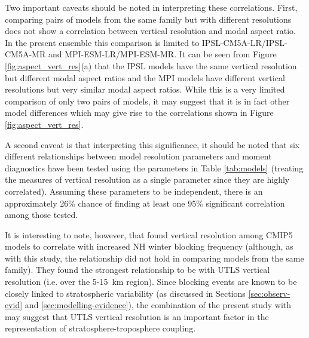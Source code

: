 Two important caveats should be noted in interpreting these correlations. First,
comparing pairs of models from the same family but with different resolutions
does not show a correlation between vertical resolution and modal aspect
ratio. In the present ensemble this comparison is limited to
IPSL-CM5A-LR/IPSL-CM5A-MR and MPI-ESM-LR/MPI-ESM-MR. It can be seen from Figure
\ref{fig:aspect_vert_res}(a) that the IPSL models have the same vertical
resolution but different modal aspect ratios and the MPI models have different
vertical resolutions but very similar modal aspect ratios. While this is a very
limited comparison of only two pairs of models, it may suggest that it is in
fact other model differences which may give rise to the correlations shown in
Figure \ref{fig:aspect_vert_res}.

A second caveat is that interpreting this significance, it should be noted that
six different relationships between model resolution parameters and moment
diagnostics have been tested using the parameters in Table \ref{tab:models}
(treating the measures of vertical resolution as a single parameter since they
are highly correlated). Assuming these parameters to be independent, there is an
approximately 26\% chance of finding at least one 95\% significant correlation
among those tested. 

It is interesting to note, however, that \citet{Anstey2013} found vertical
resolution among CMIP5 models to correlate with increased NH winter blocking
frequency (although, as with this study, the relationship did not hold in
comparing models from the same family). They found the strongest relationship to
be with UTLS vertical resolution (i.e. over the 5-15~km region). Since blocking
events are known to be closely linked to stratospheric variability (as discussed
in Sections \ref{sec:observ-evid} and \ref{sec:modelling-evidence}), the
combination of the present study with \citet{Anstey2013} may suggest that UTLS
vertical resolution is an important factor in the representation of
stratosphere-troposphere coupling.

